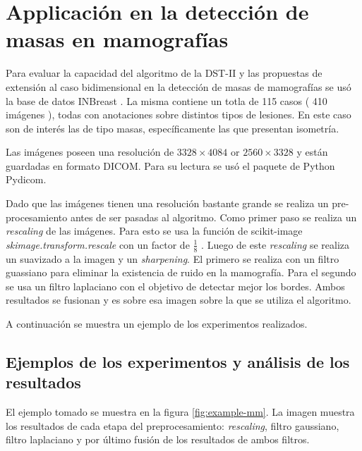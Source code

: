 \section{Applicación en la detección de masas en mamografías}

Para evaluar la capacidad del algoritmo de la DST-II y las propuestas de extensión al caso bidimensional en
la detección de masas de mamografías se usó la base de datos INBreast \cite{Moreira2012}. La misma 
contiene un totla de 115 casos ( 410 imágenes ), todas con anotaciones sobre distintos tipos de lesiones. 
En este caso son de interés las de tipo masas, específicamente las que presentan isometría.

Las imágenes poseen una resolución de $3328\times 4084$ or $2560\times 3328$ y están guardadas en formato
DICOM. Para su lectura se usó el paquete de Python Pydicom.

Dado que las imágenes tienen una resolución bastante grande se realiza un pre-procesamiento antes de ser pasadas al
algoritmo. Como primer paso se realiza un \textit{rescaling} de las imágenes. Para esto se usa la función de scikit-image
\textit{skimage.transform.rescale} con un factor de $\frac{1}{8}$ \cite{skimage-transform}. Luego de este \textit{rescaling}
se realiza un suavizado a la imagen y un \textit{sharpening}. El primero se realiza con un filtro guassiano
para eliminar la existencia de ruido en la mamografía. Para el segundo se usa un filtro laplaciano con el objetivo
de detectar mejor los bordes. Ambos resultados se fusionan y es sobre esa imagen sobre la que se utiliza el algoritmo.

A continuación se muestra un ejemplo de los experimentos realizados.

\subsection{Ejemplos de los experimentos y análisis de los resultados}

El ejemplo tomado se muestra en la figura \ref{fig:example-mm}. La imagen muestra los resultados de cada etapa 
del preprocesamiento: \textit{rescaling}, filtro gaussiano, filtro laplaciano y por último fusión de los
resultados de ambos filtros.

